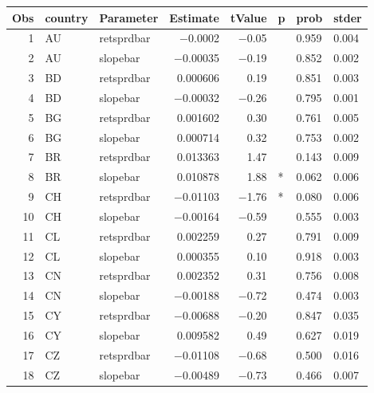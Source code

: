 

\begin{longtable}{|r|l|l|r|r|l|l|l|}\hline
   Obs &    country &    Parameter &    Estimate &    tValue &    p &    prob &    stder\\\hline
\endhead
   1 &    AU &    retsprdbar &    $-$0.0002 &    $-$0.05 &      &    0.959 &    0.004\\\hline
   2 &    AU &    slopebar &    $-$0.00035 &    $-$0.19 &      &    0.852 &    0.002\\\hline
   3 &    BD &    retsprdbar &    0.000606 &    0.19 &      &    0.851 &    0.003\\\hline
   4 &    BD &    slopebar &    $-$0.00032 &    $-$0.26 &      &    0.795 &    0.001\\\hline
   5 &    BG &    retsprdbar &    0.001602 &    0.30 &      &    0.761 &    0.005\\\hline
   6 &    BG &    slopebar &    0.000714 &    0.32 &      &    0.753 &    0.002\\\hline
   7 &    BR &    retsprdbar &    0.013363 &    1.47 &      &    0.143 &    0.009\\\hline
   8 &    BR &    slopebar &    0.010878 &    1.88 &    * &    0.062 &    0.006\\\hline
   9 &    CH &    retsprdbar &    $-$0.01103 &    $-$1.76 &    * &    0.080 &    0.006\\\hline
   10 &    CH &    slopebar &    $-$0.00164 &    $-$0.59 &      &    0.555 &    0.003\\\hline
   11 &    CL &    retsprdbar &    0.002259 &    0.27 &      &    0.791 &    0.009\\\hline
   12 &    CL &    slopebar &    0.000355 &    0.10 &      &    0.918 &    0.003\\\hline
   13 &    CN &    retsprdbar &    0.002352 &    0.31 &      &    0.756 &    0.008\\\hline
   14 &    CN &    slopebar &    $-$0.00188 &    $-$0.72 &      &    0.474 &    0.003\\\hline
   15 &    CY &    retsprdbar &    $-$0.00688 &    $-$0.20 &      &    0.847 &    0.035\\\hline
   16 &    CY &    slopebar &    0.009582 &    0.49 &      &    0.627 &    0.019\\\hline
   17 &    CZ &    retsprdbar &    $-$0.01108 &    $-$0.68 &      &    0.500 &    0.016\\\hline
   18 &    CZ &    slopebar &    $-$0.00489 &    $-$0.73 &      &    0.466 &    0.007\\\hline

\end{longtable}
